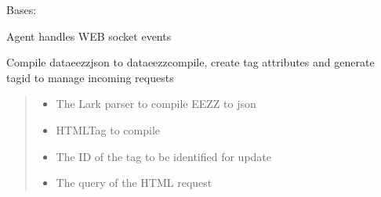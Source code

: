 \documentclass[letterpaper,10pt,english]{sphinxmanual}
\begin{document}
\begin{savenotes}\begin{fulllineitems}
\label{\detokenize{eezz:eezz.http_agent.THttpAgent}}
\pysigstartsignatures
{}
\pysigstopsignatures
\sphinxAtStartPar
Bases: 

\sphinxAtStartPar
Agent handles WEB socket events

\begin{savenotes}\begin{fulllineitems}
\label{\detokenize{eezz:eezz.http_agent.THttpAgent.compile_data}}
\pysigstartsignatures
{}
\pysigstopsignatures
\sphinxAtStartPar
Compile data\sphinxhyphen{}eezz\sphinxhyphen{}json to data\sphinxhyphen{}eezz\sphinxhyphen{}compile,
create tag attributes and generate tag\sphinxhyphen{}id to manage incoming requests
\begin{quote}\begin{description}
\begin{itemize}
\item {} 
\sphinxAtStartPar
{} \textendash{} The Lark parser to compile EEZZ to json

\item {} 
\sphinxAtStartPar
{} \textendash{} HTML\sphinxhyphen{}Tag to compile

\item {} 
\sphinxAtStartPar
{} \textendash{} The ID of the tag to be identified for update

\item {} 
\sphinxAtStartPar
{} \textendash{} The query of the HTML request


\end{itemize}
\end{description}
\end{quote}
\end{fulllineitems}
\end{savenotes}
\end{fulllineitems}
\end{savenotes}
\end{document}
